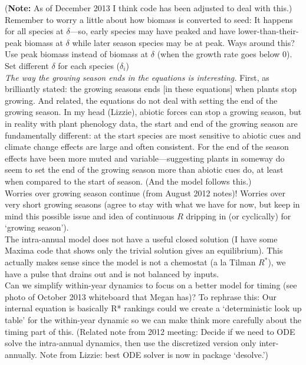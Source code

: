 \documentclass[11pt,a4paper,oneside]{article}
\begin{document}
\noindent ({\bf Note:} As of December 2013 I think code has been adjusted to deal with this.) Remember to worry a little about how biomass is converted to seed: It happens for all species at $\delta$---so, early species may have peaked and have lower-than-their-peak biomass at $\delta$ while later season species may be at peak. Ways around this?\\

\noindent Use peak biomass instead of biomass at $\delta$ (when the growth rate goes below 0). \\

\noindent Set different $\delta$ for each species ($\delta_{i}$)\\

\noindent \emph{The way the growing season ends in the equations is
interesting.} First, as brilliantly stated: the growing seasons ends
[in these equations] when plants stop growing. And related, the
equations do not deal with setting the end of the growing season. In
my head (Lizzie), abiotic forces can stop a growing season, but in
reality with plant phenology data, the start and end of the growing
season are fundamentally different: at the start species are most
sensitive to abiotic cues and climate change effects are large and
often consistent. For the end of the season effects have been more
muted and variable---suggesting plants in someway do seem to set the
end of the growing season more than abiotic cues do, at least when
compared to the start of season. (And the model follows this.)\\

Worries over growing season continue (from August 2012 notes)! Worries over very short growing seasons (agree to stay with what we have for now, but keep in mind this possible issue and idea of continuous $R$ dripping in (or cyclically) for `growing season').\\

\noindent The intra-annual model does not have a useful closed solution (I
  have some Maxima code that shows only the trivial solution gives an
  equilibrium). This actually makes sense since the model is not a
  chemostat (a la Tilman \(R^{*}\)), we have a pulse that drains out
  and is not balanced by inputs.\\

 Can we simplify within-year dynamics to focus on a better model for timing (see photo of October 2013 whiteboard that Megan has)? To rephrase this: Our internal equation is basically R* rankings could we create a `deterministic look up table' for the within-year dynamic so we can make think more carefully about the timing part of this.  (Related note from 2012 meeting: Decide if we need to ODE solve the intra-annual
  dynamics, then use the discretized version only inter-annually. Note from Lizzie: best ODE solver is now in package `desolve.')\\
\end{document}
